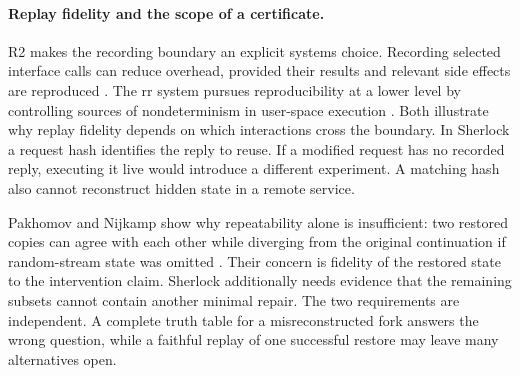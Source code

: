\documentclass[11pt,letterpaper]{article}
\begin{document}
\paragraph{Replay fidelity and the scope of a certificate.}
R2 makes the recording boundary an explicit systems choice. Recording selected interface calls can reduce overhead, provided their results and relevant side effects are reproduced \cite{r2}. The rr system pursues reproducibility at a lower level by controlling sources of nondeterminism in user-space execution \cite{rr}. Both illustrate why replay fidelity depends on which interactions cross the boundary. In Sherlock a request hash identifies the reply to reuse. If a modified request has no recorded reply, executing it live would introduce a different experiment. A matching hash also cannot reconstruct hidden state in a remote service.

Pakhomov and Nijkamp show why repeatability alone is insufficient: two restored copies can agree with each other while diverging from the original continuation if random-stream state was omitted \cite{pakhomov}. Their concern is fidelity of the restored state to the intervention claim. Sherlock additionally needs evidence that the remaining subsets cannot contain another minimal repair. The two requirements are independent. A complete truth table for a misreconstructed fork answers the wrong question, while a faithful replay of one successful restore may leave many alternatives open.
\end{document}
